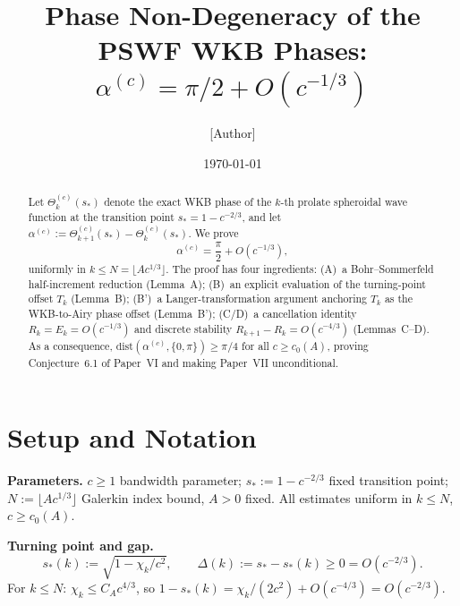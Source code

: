 \documentclass[12pt]{amsart}
\begin{document}

\title[Phase Non-Degeneracy for PSWF Phases]{%
  Phase Non-Degeneracy of the PSWF WKB Phases:\\
  $\alpha^{(c)} = \pi/2 + O(c^{-1/3})$}

\author{[Author]}
\date{\today}
\maketitle

\begin{abstract}
Let $\Theta_k^{(c)}(s_*)$ denote the exact WKB phase of the
$k$-th prolate spheroidal wave function at the transition point
$s_* = 1 - c^{-2/3}$, and let
$\alpha^{(c)} := \Theta_{k+1}^{(c)}(s_*) - \Theta_k^{(c)}(s_*)$.
We prove
\[
  \alpha^{(c)} = \frac{\pi}{2} + O(c^{-1/3}),
\]
uniformly in $k \le N = \lfloor Ac^{1/3}\rfloor$.
The proof has four ingredients:
(A)~a Bohr--Sommerfeld half-increment reduction (Lemma~A);
(B)~an explicit evaluation of the turning-point offset $T_k$
    (Lemma~B);
(B')~a Langer-transformation argument anchoring $T_k$
     as the WKB-to-Airy phase offset (Lemma~B');
(C/D)~a cancellation identity $R_k = E_k = O(c^{-1/3})$
      and discrete stability $R_{k+1} - R_k = O(c^{-4/3})$
      (Lemmas~C--D).
As a consequence, $\mathrm{dist}(\alpha^{(c)},\{0,\pi\}) \ge \pi/4$
for all $c \ge c_0(A)$,
proving Conjecture~6.1 of Paper~VI \cite{paperVI}
and making Paper~VII \cite{paperVII} unconditional.
\end{abstract}

\section{Setup and Notation}
\label{sec:setup}

\noindent\textbf{Parameters.}
$c \ge 1$ bandwidth parameter;
$s_* := 1 - c^{-2/3}$ fixed transition point;
$N := \lfloor Ac^{1/3}\rfloor$ Galerkin index bound, $A > 0$ fixed.
All estimates uniform in $k \le N$, $c \ge c_0(A)$.

\medskip
\noindent\textbf{Turning point and gap.}
\begin{equation}\label{eq:turning-point}
  s_*(k) := \sqrt{1 - \chi_k/c^2}, \qquad
  \Delta(k) := s_* - s_*(k) \ge 0 = O(c^{-2/3}).
\end{equation}
For $k \le N$: $\chi_k \le C_A c^{4/3}$, so
$1 - s_*(k) = \chi_k/(2c^2) + O(c^{-4/3}) = O(c^{-2/3})$.
\end{document}
